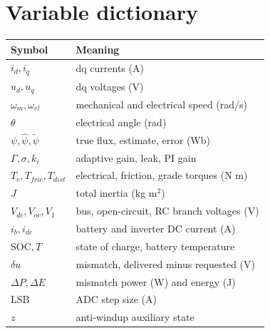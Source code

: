 \documentclass[11pt]{article}
\begin{document}
\section{Variable dictionary}
\begin{longtable}{@{}ll@{}}
\toprule
Symbol & Meaning \\
\midrule
$i_d, i_q$ & dq currents (A) \\
$u_d, u_q$ & dq voltages (V) \\
$\omega_m, \omega_{el}$ & mechanical and electrical speed (rad/s) \\
$\theta$ & electrical angle (rad) \\
$\psi, \hat\psi, \tilde\psi$ & true flux, estimate, error (Wb) \\
$\Gamma, \sigma, k_i$ & adaptive gain, leak, PI gain \\
$T_e, T_{fric}, T_{dist}$ & electrical, friction, grade torques (N m) \\
$J$ & total inertia (kg m$^2$) \\
$V_{dc}, V_{oc}, V_1$ & bus, open-circuit, RC branch voltages (V) \\
$i_b, i_{dc}$ & battery and inverter DC current (A) \\
$\mathrm{SOC}, T$ & state of charge, battery temperature \\
$\delta u$ & mismatch, delivered minus requested (V) \\
$\Delta P, \Delta E$ & mismatch power (W) and energy (J) \\
$\mathrm{LSB}$ & ADC step size (A) \\
$z$ & anti-windup auxiliary state \\
\bottomrule
\end{longtable}
\end{document}
